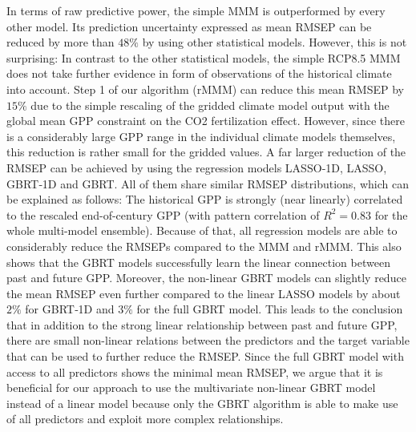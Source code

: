 In terms of raw predictive power, the simple \ac{MMM} is outperformed by every
other model. Its prediction uncertainty expressed as mean \ac{RMSEP} can be
reduced by more than $48 \unit{\%}$ by using other statistical models. However,
this is not surprising: In contrast to the other statistical models, the simple
\acs{RCP}8.5 \ac{MMM} does not take further evidence in form of observations of
the historical climate into account. Step 1 of our algorithm (r\acs{MMM}) can
reduce this mean \ac{RMSEP} by $15 \unit{\%}$ due to the simple rescaling of
the gridded climate model output with the global mean \ac{GPP} constraint on
the \ac{CO2} fertilization effect. However, since there is a considerably large
\ac{GPP} range in the individual climate models themselves, this reduction is
rather small for the gridded values. A far larger reduction of the \ac{RMSEP}
can be achieved by using the regression models \acs{LASSO}‐1D, \ac{LASSO},
\acs{GBRT}‐1D and \ac{GBRT}. All of them share similar \ac{RMSEP}
distributions, which can be explained as follows: The historical \ac{GPP} is
strongly (near linearly) correlated to the rescaled end-of-century \ac{GPP}
(with pattern correlation of $R^2 = 0.83$ for the whole multi-model ensemble).
Because of that, all regression models are able to considerably reduce the
\acp{RMSEP} compared to the \ac{MMM} and r\acs{MMM}. This also shows that the
\ac{GBRT} models successfully learn the linear connection between past and
future \ac{GPP}. Moreover, the non-linear \ac{GBRT} models can slightly reduce
the mean \ac{RMSEP} even further compared to the linear \ac{LASSO} models by
about $2 \unit{\%}$ for \acs{GBRT}‐1D and $3 \unit{\%}$ for the full \ac{GBRT}
model. This leads to the conclusion that in addition to the strong linear
relationship between past and future \ac{GPP}, there are small non-linear
relations between the predictors and the target variable that can be used to
further reduce the \ac{RMSEP}. Since the full \ac{GBRT} model with access to
all predictors shows the minimal mean \ac{RMSEP}, we argue that it is
beneficial for our approach to use the multivariate non-linear \ac{GBRT} model
instead of a linear model because only the \ac{GBRT} algorithm is able to make
use of all predictors and exploit more complex relationships.

